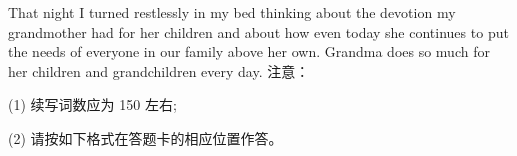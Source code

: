 \documentclass{英语试卷}
\begin{document}
\par That night I turned restlessly in my bed thinking about the devotion my grandmother had for her children and about how even today she continues to put the needs of everyone in our family above her own. Grandma does so much for her children and grandchildren every day. 注意：\par
\par (1) 续写词数应为 150 左右;\par
\par (2) 请按如下格式在答题卡的相应位置作答。\par
{}
\end{document}
